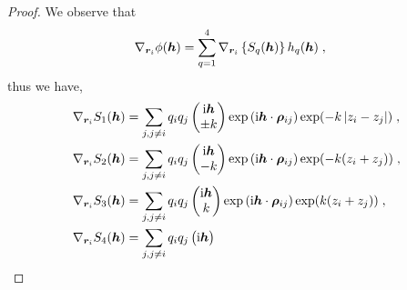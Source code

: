 \begin{proof}
We observe that 
\begin{align*}
 \nabla_{\bm{r}_i}\phi(\boldsymbol{h})&=   \sum_{q=1}^4 \nabla_{\bm{r}_i}\left\{S_q(\boldsymbol{h})\right\}h_q(\boldsymbol{h})\;,
\end{align*}
thus we have,
\begin{align*}
 \nabla_{\bm{r}_i} S_1(\boldsymbol{h})&=\sum_{j,j\neq i}q_iq_j   \begin{pmatrix} \mathrm{i} \boldsymbol{h} \\
 \pm k  \end{pmatrix}\exp{(\mathrm{i} \boldsymbol{h} \cdot \boldsymbol{\rho}_{ij})}\exp(-k\left\lvert z_i-z_j\right\rvert)\;,\\
 \nabla_{\bm{r}_i} S_2(\boldsymbol{h})&=\sum_{j,j\neq i}q_iq_j   \begin{pmatrix} \mathrm{i} \boldsymbol{h} \\
 -k  \end{pmatrix}\exp{(\mathrm{i} \boldsymbol{h} \cdot \boldsymbol{\rho}_{ij})}\exp(-k(z_i+z_j))\;,\\
  \nabla_{\bm{r}_i} S_3(\boldsymbol{h})&=\sum_{j,j\neq i}q_iq_j   \begin{pmatrix} \mathrm{i} \boldsymbol{h} \\
 k  \end{pmatrix}\exp{(\mathrm{i} \boldsymbol{h} \cdot \boldsymbol{\rho}_{ij})}\exp(k(z_i+z_j))\;,\\
 \nabla_{\bm{r}_i} S_4(\boldsymbol{h})&=\sum_{j,j\neq i}q_iq_j   \begin{pmatrix} \mathrm{i} \boldsymbol{h} \\

\end{pmatrix}
\end{align*}
\end{proof}
